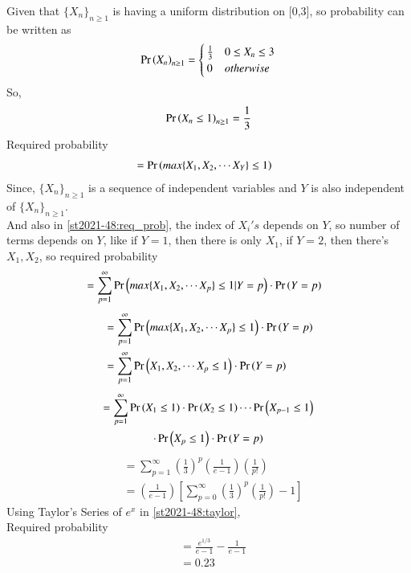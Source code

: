 
Given that $\{X_n\}_{n\ge 1}$ is having a uniform distribution on [0,3], so probability can be written as
\begin{align}
\Pr\left(X_n\right)_{n\ge 1}=  
\begin{cases}
\frac{1}{3} & 0\le X_n\le 3 \\
0 & otherwise
\end{cases}
\end{align}
So,
\begin{align}
    \Pr\left(X_n\le 1\right)_{n\ge 1}=\frac{1}{3}
\end{align}
Required probability
\begin{align}
 &=\Pr\left(max\{X_1,X_2,\cdots X_Y\}\le 1\right)\label{st2021-48:req_prob}
 \end{align}
 Since, $\{X_n\}_{n\ge 1}$ is a sequence of independent variables and $Y$ is also independent of $\{X_n\}_{n\ge 1}$.\\
 And also in \eqref{st2021-48:req_prob}, the index of $X_i's$ depends on $Y$, so number of terms depends on $Y$, like if $Y=1$, then there is only $X_1$, if $Y=2$, then there's $X_1,X_2$, so required probability
\begin{align}
&=\sum_{p=1}^{\infty}\Pr\left(max\{X_1,X_2,\cdots X_p\}\le 1|Y=p\right)\cdot \Pr\left(Y=p\right)
\end{align}
\begin{align}
& =\sum_{p=1}^{\infty}\Pr\left(max\{X_1,X_2,\cdots X_p\}\le 1\right)\cdot \Pr\left(Y=p\right)\\
&=\sum_{p=1}^{\infty}\Pr\left(X_1,X_2,\cdots X_p\le 1\right)\cdot \Pr\left(Y=p\right)
\end{align}
\begin{multline}
=\sum_{p=1}^{\infty}\Pr\left(X_1\le 1\right)\cdot \Pr\left(X_2\le 1\right)\cdots \Pr\left(X_{p-1}\le 1\right)\\
\cdot \Pr\left(X_p\le 1\right)\cdot \Pr\left(Y=p\right)
\end{multline}
\begin{align}
&=\sum_{p=1}^{\infty}\left(\frac{1}{3}\right)^p\left(\frac{1}{e-1}\right)\left(\frac{1}{p!}\right)\\
&=\left(\frac{1}{e-1}\right)\left[\sum_{p=0}^{\infty}\left(\frac{1}{3}\right)^p\left(\frac{1}{p!}\right)-1\right]
\label{st2021-48:taylor}
\end{align}
Using Taylor's Series of $e^x$ in \eqref{st2021-48:taylor}, \\
Required probability
\begin{align}
    &=\frac{e^{1/3}}{e-1}-\frac{1}{e-1}\\
    &=0.23
\end{align}
    
